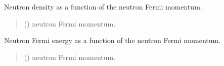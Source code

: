\documentclass[letterpaper,10pt,english]{sphinxmanual}
\begin{document}

\begin{fulllineitems}
\label{\detokenize{source/api/setup_matter_ffg:nucleardatapy.matter.setup_ffg.den_n}}
\pysigstartsignatures
{}
\pysigstopsignatures
\sphinxAtStartPar
Neutron density as a function of the neutron Fermi momentum.
\begin{quote}\begin{description}
\sphinxAtStartPar
{} () \textendash{} neutron Fermi momentum.

\end{description}\end{quote}

\end{fulllineitems}


\begin{fulllineitems}
\label{\detokenize{source/api/setup_matter_ffg:nucleardatapy.matter.setup_ffg.eF_n}}
\pysigstartsignatures
{}
\pysigstopsignatures
\sphinxAtStartPar
Neutron Fermi energy as a function of the neutron Fermi momentum.
\begin{quote}\begin{description}
\sphinxAtStartPar
{} () \textendash{} neutron Fermi momentum.

\end{description}\end{quote}

\end{fulllineitems}
\end{document}

